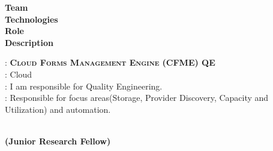 \documentclass[a4paper,11pt]{memoir} %
\begin{document}
\begin{minipage}[t]{0.20\columnwidth}
\textbf{Team}\\
\textbf{Technologies}\\
\textbf{Role}\\
\textbf{Description}
\end{minipage}
\hfill
\begin{minipage}[t]{0.80\columnwidth}
: \textbf{\textsc{Cloud Forms Management Engine (CFME) QE}}\\
: Cloud\\
: I am responsible for Quality Engineering.\\
: Responsible for focus areas(Storage, Provider Discovery, Capacity and Utilization) and automation.
\end{minipage}

\Sep


\begin{minipage}[t]{0.20\columnwidth}
\end{minipage}
\hfill
\begin{minipage}[t]{0.80\columnwidth}
\begin{center}
\\
\textbf{(Junior Research Fellow)}  
\end{center}
\end{minipage}
\end{document}
